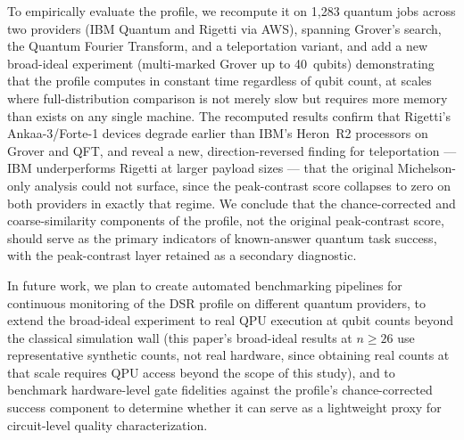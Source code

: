 To empirically evaluate the profile, we recompute it on 1{,}283 quantum jobs across two providers (IBM Quantum and Rigetti via AWS), spanning Grover's search, the Quantum Fourier Transform, and a teleportation variant, and add a new broad-ideal experiment (multi-marked Grover up to 40~qubits) demonstrating that the profile computes in constant time regardless of qubit count, at scales where full-distribution comparison is not merely slow but requires more memory than exists on any single machine. The recomputed results confirm that Rigetti's Ankaa-3/Forte-1 devices degrade earlier than IBM's Heron~R2 processors on Grover and QFT, and reveal a new, direction-reversed finding for teleportation --- IBM underperforms Rigetti at larger payload sizes --- that the original Michelson-only analysis could not surface, since the peak-contrast score collapses to zero on both providers in exactly that regime. We conclude that the chance-corrected and coarse-similarity components of the profile, not the original peak-contrast score, should serve as the primary indicators of known-answer quantum task success, with the peak-contrast layer retained as a secondary diagnostic.

In future work, we plan to create automated benchmarking pipelines for continuous monitoring of the DSR profile on different quantum providers, to extend the broad-ideal experiment to real QPU execution at qubit counts beyond the classical simulation wall (this paper's broad-ideal results at $n \geq 26$ use representative synthetic counts, not real hardware, since obtaining real counts at that scale requires QPU access beyond the scope of this study), and to benchmark hardware-level gate fidelities against the profile's chance-corrected success component to determine whether it can serve as a lightweight proxy for circuit-level quality characterization.


